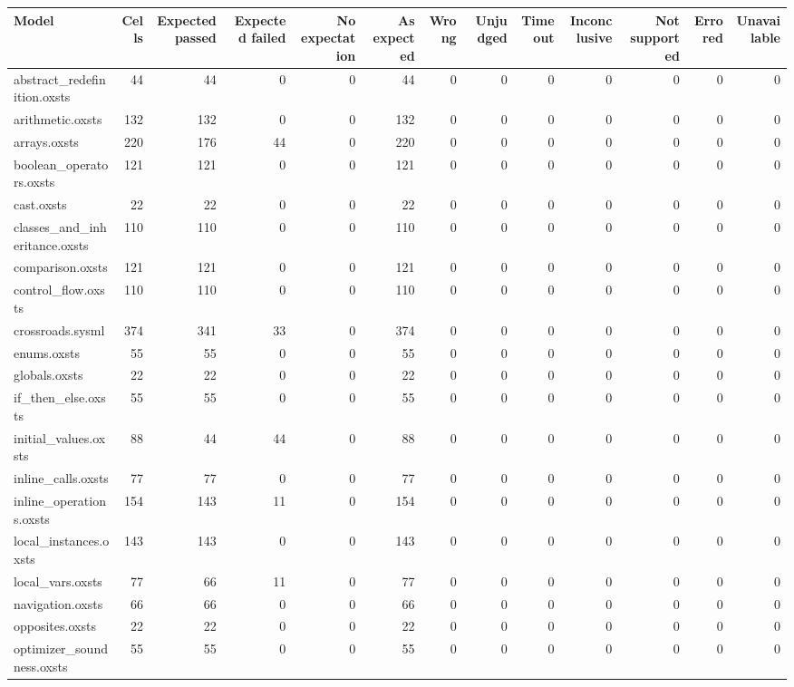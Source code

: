 \begin{tabular}{lrrrrrrrrrrrr}
\toprule
Model & Cells & Expected passed & Expected failed & No expectation & As expected & Wrong & Unjudged & Timeout & Inconclusive & Not supported & Errored & Unavailable \\
\midrule
abstract\_redefinition.oxsts & 44 & 44 & 0 & 0 & 44 & 0 & 0 & 0 & 0 & 0 & 0 & 0 \\
arithmetic.oxsts & 132 & 132 & 0 & 0 & 132 & 0 & 0 & 0 & 0 & 0 & 0 & 0 \\
arrays.oxsts & 220 & 176 & 44 & 0 & 220 & 0 & 0 & 0 & 0 & 0 & 0 & 0 \\
boolean\_operators.oxsts & 121 & 121 & 0 & 0 & 121 & 0 & 0 & 0 & 0 & 0 & 0 & 0 \\
cast.oxsts & 22 & 22 & 0 & 0 & 22 & 0 & 0 & 0 & 0 & 0 & 0 & 0 \\
classes\_and\_inheritance.oxsts & 110 & 110 & 0 & 0 & 110 & 0 & 0 & 0 & 0 & 0 & 0 & 0 \\
comparison.oxsts & 121 & 121 & 0 & 0 & 121 & 0 & 0 & 0 & 0 & 0 & 0 & 0 \\
control\_flow.oxsts & 110 & 110 & 0 & 0 & 110 & 0 & 0 & 0 & 0 & 0 & 0 & 0 \\
crossroads.sysml & 374 & 341 & 33 & 0 & 374 & 0 & 0 & 0 & 0 & 0 & 0 & 0 \\
enums.oxsts & 55 & 55 & 0 & 0 & 55 & 0 & 0 & 0 & 0 & 0 & 0 & 0 \\
globals.oxsts & 22 & 22 & 0 & 0 & 22 & 0 & 0 & 0 & 0 & 0 & 0 & 0 \\
if\_then\_else.oxsts & 55 & 55 & 0 & 0 & 55 & 0 & 0 & 0 & 0 & 0 & 0 & 0 \\
initial\_values.oxsts & 88 & 44 & 44 & 0 & 88 & 0 & 0 & 0 & 0 & 0 & 0 & 0 \\
inline\_calls.oxsts & 77 & 77 & 0 & 0 & 77 & 0 & 0 & 0 & 0 & 0 & 0 & 0 \\
inline\_operations.oxsts & 154 & 143 & 11 & 0 & 154 & 0 & 0 & 0 & 0 & 0 & 0 & 0 \\
local\_instances.oxsts & 143 & 143 & 0 & 0 & 143 & 0 & 0 & 0 & 0 & 0 & 0 & 0 \\
local\_vars.oxsts & 77 & 66 & 11 & 0 & 77 & 0 & 0 & 0 & 0 & 0 & 0 & 0 \\
navigation.oxsts & 66 & 66 & 0 & 0 & 66 & 0 & 0 & 0 & 0 & 0 & 0 & 0 \\
opposites.oxsts & 22 & 22 & 0 & 0 & 22 & 0 & 0 & 0 & 0 & 0 & 0 & 0 \\
optimizer\_soundness.oxsts & 55 & 55 & 0 & 0 & 55 & 0 & 0 & 0 & 0 & 0 & 0 & 0 \\

\end{tabular}
